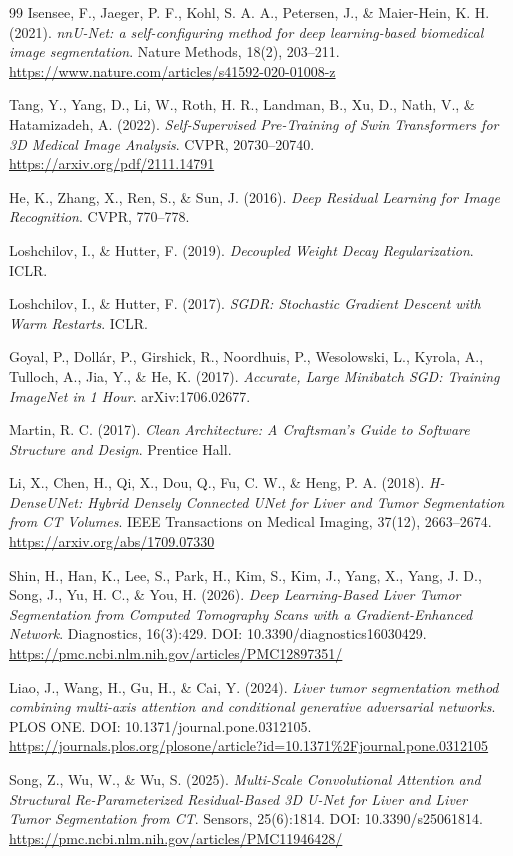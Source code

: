 \documentclass[12pt, a4paper]{report}
\begin{document}
\begin{thebibliography}{99}
Isensee, F., Jaeger, P. F., Kohl, S. A. A., Petersen, J., \& Maier-Hein, K. H. (2021).
\textit{nnU-Net: a self-configuring method for deep learning-based biomedical image segmentation}.
Nature Methods, 18(2), 203--211.
\url{https://www.nature.com/articles/s41592-020-01008-z}

Tang, Y., Yang, D., Li, W., Roth, H. R., Landman, B., Xu, D., Nath, V., \& Hatamizadeh, A. (2022).
\textit{Self-Supervised Pre-Training of Swin Transformers for 3D Medical Image Analysis}.
CVPR, 20730--20740.
\url{https://arxiv.org/pdf/2111.14791}

He, K., Zhang, X., Ren, S., \& Sun, J. (2016).
\textit{Deep Residual Learning for Image Recognition}.
CVPR, 770--778.

Loshchilov, I., \& Hutter, F. (2019).
\textit{Decoupled Weight Decay Regularization}.
ICLR.

Loshchilov, I., \& Hutter, F. (2017).
\textit{SGDR: Stochastic Gradient Descent with Warm Restarts}.
ICLR.

Goyal, P., Dollár, P., Girshick, R., Noordhuis, P., Wesolowski, L., Kyrola, A.,
Tulloch, A., Jia, Y., \& He, K. (2017).
\textit{Accurate, Large Minibatch SGD: Training ImageNet in 1 Hour}.
arXiv:1706.02677.

Martin, R. C. (2017).
\textit{Clean Architecture: A Craftsman's Guide to Software Structure and Design}.
Prentice Hall.

Li, X., Chen, H., Qi, X., Dou, Q., Fu, C. W., \& Heng, P. A. (2018).
\textit{H-DenseUNet: Hybrid Densely Connected UNet for Liver and Tumor
Segmentation from CT Volumes}.
IEEE Transactions on Medical Imaging, 37(12), 2663--2674.
\url{https://arxiv.org/abs/1709.07330}

Shin, H., Han, K., Lee, S., Park, H., Kim, S., Kim, J., Yang, X., Yang, J. D.,
Song, J., Yu, H. C., \& You, H. (2026).
\textit{Deep Learning-Based Liver Tumor Segmentation from Computed Tomography
Scans with a Gradient-Enhanced Network}.
Diagnostics, 16(3):429.
DOI: 10.3390/diagnostics16030429.
\url{https://pmc.ncbi.nlm.nih.gov/articles/PMC12897351/}

Liao, J., Wang, H., Gu, H., \& Cai, Y. (2024).
\textit{Liver tumor segmentation method combining multi-axis attention and
conditional generative adversarial networks}.
PLOS ONE.
DOI: 10.1371/journal.pone.0312105.
\url{https://journals.plos.org/plosone/article?id=10.1371%2Fjournal.pone.0312105}

Song, Z., Wu, W., \& Wu, S. (2025).
\textit{Multi-Scale Convolutional Attention and Structural Re-Parameterized
Residual-Based 3D U-Net for Liver and Liver Tumor Segmentation from CT}.
Sensors, 25(6):1814.
DOI: 10.3390/s25061814.
\url{https://pmc.ncbi.nlm.nih.gov/articles/PMC11946428/}

\end{thebibliography}
\end{document}
